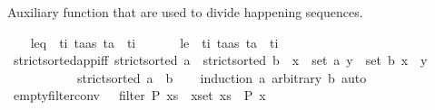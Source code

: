 \begin{isabellebody}
{}%
\begin{isamarkuptext}%
Auxiliary function that are used to divide happening sequences.%
\end{isamarkuptext}\isamarkuptrue%
\ \ \isamarkupfalse%
\ {\isachardoublequoteopen}leq\ {\isasymequiv}\ {\isasymlambda}t\isactrlsub i{\isachardot}{\kern0pt}\ {\isasymlambda}{\isacharparenleft}{\kern0pt}t\isactrlsub a{\isacharcomma}{\kern0pt}as{\isacharparenright}{\kern0pt}{\isachardot}{\kern0pt}\ t\isactrlsub a\ {\isasymle}\ t\isactrlsub i{\isachardoublequoteclose}\isanewline
\ \ \isanewline
\ \ \isamarkupfalse%
\ {\isachardoublequoteopen}le\ {\isasymequiv}\ {\isasymlambda}t\isactrlsub i{\isachardot}{\kern0pt}\ {\isasymlambda}{\isacharparenleft}{\kern0pt}t\isactrlsub a{\isacharcomma}{\kern0pt}as{\isacharparenright}{\kern0pt}{\isachardot}{\kern0pt}\ t\isactrlsub a\ {\isacharless}{\kern0pt}\ t\isactrlsub i{\isachardoublequoteclose}\isanewline
\isanewline
{}\isamarkupfalse%
\ strict{\isacharunderscore}{\kern0pt}sorted{\isacharunderscore}{\kern0pt}app{\isacharunderscore}{\kern0pt}iff{\isacharcolon}{\kern0pt}\ {\isachardoublequoteopen}strict{\isacharunderscore}{\kern0pt}sorted\ a\ {\isasymand}\ strict{\isacharunderscore}{\kern0pt}sorted\ b\ {\isasymand}\ {\isacharparenleft}{\kern0pt}{\isasymforall}x\ {\isasymin}\ set\ a{\isachardot}{\kern0pt}\ {\isasymforall}y\ {\isasymin}\ set\ b{\isachardot}{\kern0pt}\ x\ {\isacharless}{\kern0pt}\ y{\isacharparenright}{\kern0pt}\isanewline
\ \ \ \ \ \ \ \ \ \ {\isasymlongleftrightarrow}\ strict{\isacharunderscore}{\kern0pt}sorted\ {\isacharparenleft}{\kern0pt}a\ {\isacharat}{\kern0pt}\ b{\isacharparenright}{\kern0pt}{\isachardoublequoteclose}\isanewline
%
\isadelimproof
\ \ %
\endisadelimproof
%
\isatagproof
{}\isamarkupfalse%
\ {\isacharparenleft}{\kern0pt}induction\ a\ arbitrary{\isacharcolon}{\kern0pt}\ b{\isacharparenright}{\kern0pt}\ auto%
\endisatagproof
{\isafoldproof}%
%
\isadelimproof
\isanewline
%
\endisadelimproof
\isanewline
{}\isamarkupfalse%
\ empty{\isacharunderscore}{\kern0pt}filter{\isacharunderscore}{\kern0pt}conv{\isacharcolon}{\kern0pt}\ {\isachardoublequoteopen}{\isacharbrackleft}{\kern0pt}{\isacharbrackright}{\kern0pt}\ {\isacharequal}{\kern0pt}\ filter\ P\ xs\ {\isasymlongleftrightarrow}\ {\isacharparenleft}{\kern0pt}{\isasymforall}x{\isasymin}set\ xs{\isachardot}{\kern0pt}\ {\isasymnot}\ P\ x{\isacharparenright}{\kern0pt}{\isachardoublequoteclose}\isanewline
%
\isadelimproof
\ \ %
\endisadelimproof
%
\isatagproof
{}\isamarkupfalse%

\end{isabellebody}
